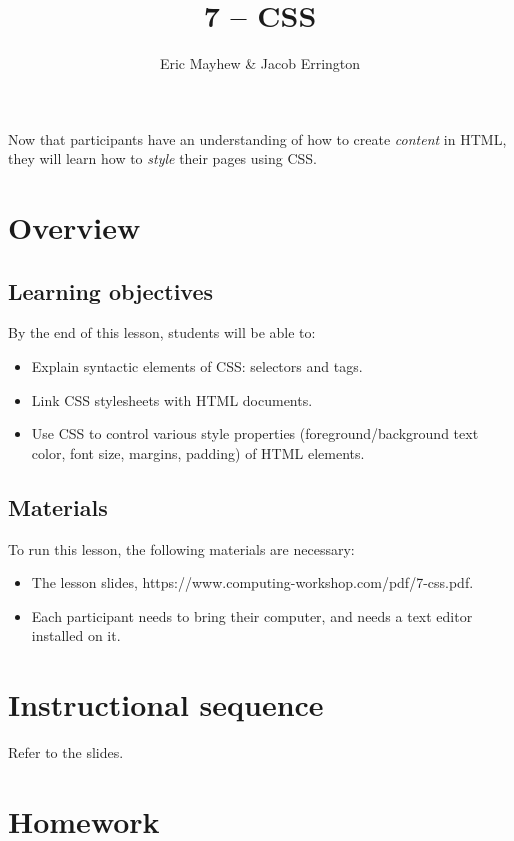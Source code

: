 \documentclass[11pt]{article}
\title{7 -- CSS}
\author{Eric Mayhew \& Jacob Errington}
\date{}
\newcommand{\cwurl}{https://www.computing-workshop.com/}
\newcommand{\cwpdf}{\cwurl pdf/}
\begin{document}
\maketitle

Now that participants have an understanding of how to create \emph{content} in
HTML, they will learn how to \emph{style} their pages using CSS.

\section*{Overview}

\subsection*{Learning objectives}

By the end of this lesson, students will be able to:
%
\begin{itemize}
\item Explain syntactic elements of CSS: selectors and tags.
\item Link CSS stylesheets with HTML documents.
\item Use CSS to control various style properties (foreground/background text
  color, font size, margins, padding) of HTML elements.
\end{itemize}

\subsection*{Materials}

To run this lesson, the following materials are necessary:

\begin{itemize}
\item The lesson slides, \cwpdf{7-css.pdf}.
\item Each participant needs to bring their computer, and needs a text editor
  installed on it.
\end{itemize}

\section*{Instructional sequence}

Refer to the slides.

\section*{Homework}
\end{document}
